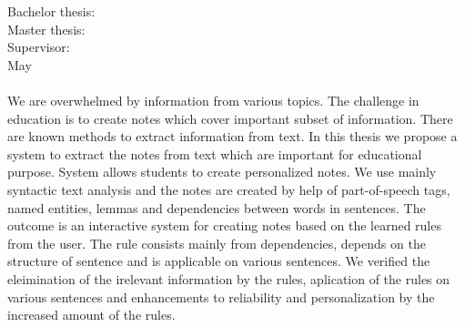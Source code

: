 {
	{Bachelor thesis: }\Title \\
}
{
	{Master thesis: }\Title \\
}
Supervisor: \Supervisor \\
May \Year \\
\noindent
\\
We are overwhelmed by information from various topics. The challenge in education is to create notes which cover important subset of information. There are known methods to extract information from text. In this thesis we propose a system to extract the notes from text which are important for educational purpose. System allows students to create personalized notes. We use mainly syntactic text analysis and the notes are created by help of part-of-speech tags, named entities, lemmas and dependencies between words in sentences. The outcome is an interactive system for creating notes based on the learned rules from the user. The rule consists mainly from dependencies, depends on the structure of sentence and is applicable on various sentences. We verified the eleimination of the irelevant information by the rules, aplication of the rules on various sentences and enhancements to reliability and personalization by the increased amount of the rules.